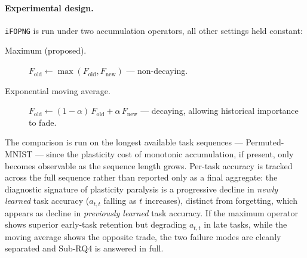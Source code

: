 \paragraph{Experimental design.}
\texttt{iFOPNG} is run under two accumulation operators, all other settings
held constant:
\begin{description}
    \item[Maximum (proposed).] $F_{\mathrm{old}} \leftarrow
    \max(F_{\mathrm{old}}, F_{\mathrm{new}})$ --- non-decaying.
    \item[Exponential moving average.] $F_{\mathrm{old}} \leftarrow
    (1-\alpha)\,F_{\mathrm{old}} + \alpha\,F_{\mathrm{new}}$ ---
    decaying, allowing historical importance to fade.
\end{description}
The comparison is run on the longest available task sequences ---
Permuted-MNIST --- since the plasticity cost of
monotonic accumulation, if present, only becomes observable as the
sequence length grows.
Per-task accuracy is tracked across the full sequence rather than reported
only as a final aggregate: the diagnostic signature of plasticity paralysis
is a progressive decline in \emph{newly learned} task accuracy
($a_{t,t}$ falling as $t$ increases), distinct from forgetting, which
appears as decline in \emph{previously learned} task accuracy.
If the maximum operator shows superior early-task retention but degrading
$a_{t,t}$ in late tasks, while the moving average shows the opposite trade,
the two failure modes are cleanly separated and Sub-RQ4 is answered in
full.